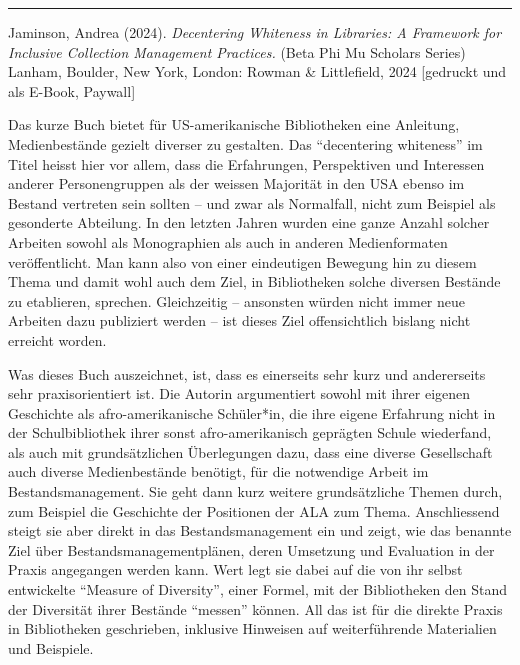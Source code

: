 \documentclass[a4paper,
fontsize=11pt,
oneside,
numbers=noperiodatend,
parskip=half-,
bibliography=totoc,
final
]{scrartcl}
\begin{document}
\begin{center}\rule{0.5\linewidth}{0.5pt}\end{center}

Jaminson, Andrea (2024). \emph{Decentering Whiteness in Libraries: A
Framework for Inclusive Collection Management Practices.} (Beta Phi Mu
Scholars Series) Lanham, Boulder, New York, London: Rowman \&
Littlefield, 2024 {[}gedruckt und als E-Book, Paywall{]}

Das kurze Buch bietet für US-amerikanische Bibliotheken eine Anleitung,
Medienbestände gezielt diverser zu gestalten. Das \enquote{decentering
whiteness} im Titel heisst hier vor allem, dass die Erfahrungen,
Perspektiven und Interessen anderer Personengruppen als der weissen
Majorität in den USA ebenso im Bestand vertreten sein sollten -- und
zwar als Normalfall, nicht zum Beispiel als gesonderte Abteilung. In den
letzten Jahren wurden eine ganze Anzahl solcher Arbeiten sowohl als
Monographien als auch in anderen Medienformaten veröffentlicht. Man kann
also von einer eindeutigen Bewegung hin zu diesem Thema und damit wohl
auch dem Ziel, in Bibliotheken solche diversen Bestände zu etablieren,
sprechen. Gleichzeitig -- ansonsten würden nicht immer neue Arbeiten
dazu publiziert werden -- ist dieses Ziel offensichtlich bislang nicht
erreicht worden.

Was dieses Buch auszeichnet, ist, dass es einerseits sehr kurz und
andererseits sehr praxisorientiert ist. Die Autorin argumentiert sowohl
mit ihrer eigenen Geschichte als afro-amerikanische Schüler*in, die ihre
eigene Erfahrung nicht in der Schulbibliothek ihrer sonst
afro-amerikanisch geprägten Schule wiederfand, als auch mit
grundsätzlichen Überlegungen dazu, dass eine diverse Gesellschaft auch
diverse Medienbestände benötigt, für die notwendige Arbeit im
Bestandsmanagement. Sie geht dann kurz weitere grundsätzliche Themen
durch, zum Beispiel die Geschichte der Positionen der ALA zum Thema.
Anschliessend steigt sie aber direkt in das Bestandsmanagement ein und
zeigt, wie das benannte Ziel über Bestandsmanagementplänen, deren
Umsetzung und Evaluation in der Praxis angegangen werden kann. Wert legt
sie dabei auf die von ihr selbst entwickelte \enquote{Measure of
Diversity}, einer Formel, mit der Bibliotheken den Stand der Diversität
ihrer Bestände \enquote{messen} können. All das ist für die direkte
Praxis in Bibliotheken geschrieben, inklusive Hinweisen auf
weiterführende Materialien und Beispiele.
\end{document}
